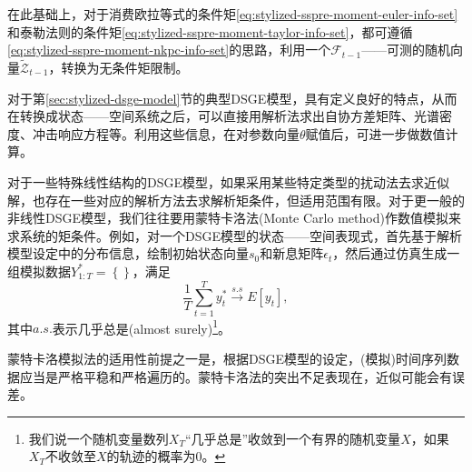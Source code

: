 在此基础上，对于消费欧拉等式的条件矩\eqref{eq:stylized-sspre-moment-euler-info-set}和泰勒法则的条件矩\eqref{eq:stylized-sspre-moment-taylor-info-set}，都可遵循\eqref{eq:stylized-sspre-moment-nkpc-info-set}的思路，利用一个$\mathcal{F}_{t-1}$——可测的随机向量$\widetilde{\mathcal{Z}}_{t-1}$，转换为无条件矩限制。

对于第\ref{sec:stylized-dsge-model}节的典型DSGE模型，具有定义良好的特点，从而在转换成状态——空间系统之后，可以直接用解析法求出自协方差矩阵、光谱密度、冲击响应方程等。利用这些信息，在对参数向量$\theta$赋值后，可进一步做数值计算。

对于一些特殊线性结构的DSGE模型，如果采用某些特定类型的扰动法去求近似解，也存在一些对应的解析方法去求解析矩条件，但适用范围有限\citep{Andreasen:2016cd}。对于更一般的非线性DSGE模型，我们往往要用蒙特卡洛法(Monte Carlo method)作数值模拟来求系统的矩条件。例如，对一个DSGE模型的状态——空间表现式，首先基于解析模型设定中的分布信息，绘制初始状态向量$s_{0}$和新息矩阵$\epsilon_{t}$，然后通过仿真生成一组模拟数据$Y_{1:T}^{*}=\left\{ \right\}$，满足
\begin{equation}
  \label{eq:stylized-ssrep-simulation-mcmc}
  \frac{1}{T} \sum_{t=1}^{T} y_{t}^{*} \xrightarrow{s.s} E \left[ y_{t} \right],
\end{equation}
其中$a.s.$表示几乎总是(almost surely)\footnote{我们说一个随机变量数列$X_{T}$“几乎总是”收敛到一个有界的随机变量$X$，如果$X_{T}$不收敛至$X$的轨迹的概率为$0$。}。

蒙特卡洛模拟法的适用性前提之一是，根据DSGE模型的设定，(模拟)时间序列数据应当是严格平稳和严格遍历的。蒙特卡洛法的突出不足表现在，近似可能会有误差。%
